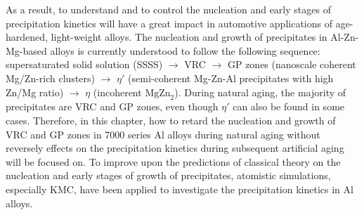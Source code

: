 As a result, to understand and to control the nucleation and early stages of precipitation kinetics will have a great impact in automotive applications of age-hardened, light-weight alloys. \cite{deschamps1998influence,banhart2011kinetics,liang2012kinetics,deschamps2014precipitation} The nucleation and growth of precipitates in Al-Zn-Mg-based alloys is currently understood to follow the following sequence: supersaturated solid solution (SSSS) $\rightarrow$ \acf{VRC} $\rightarrow$ \acf{GP} zones (nanoscale coherent Mg/Zn-rich clusters) $\rightarrow$ $\eta'$ (semi-coherent Mg-Zn-Al precipitates with high Zn/Mg ratio) $\rightarrow$ $\eta$ (incoherent $\text{MgZn}_\text{2}$). \cite{ragueneau2000review,deschamps2014precipitation,berg2001gp,chung2018transmission} During natural aging, the majority of precipitates are \ac{VRC} and \ac{GP} zones, even though $\eta'$ can also be found in some cases. \cite{mukhopadhyay1994guinier} Therefore, in this chapter, how to retard the nucleation and growth of \ac{VRC} and \ac{GP} zones in 7000 series Al alloys during natural aging without reversely effects on the precipitation kinetics during subsequent artificial aging will be focused on. To improve upon the predictions of classical theory on the nucleation and early stages of growth of precipitates, atomistic simulations, especially \ac{KMC}, have been applied to investigate the precipitation kinetics in Al alloys. \cite{clouet2006kinetic,soisson2010atomistic,soisson1996monte,liang2012kinetics,sha2005kinetic,clouet2004nucleation,vincent2008precipitation,hirosawa1998comparison,sanchez1984generalized}


